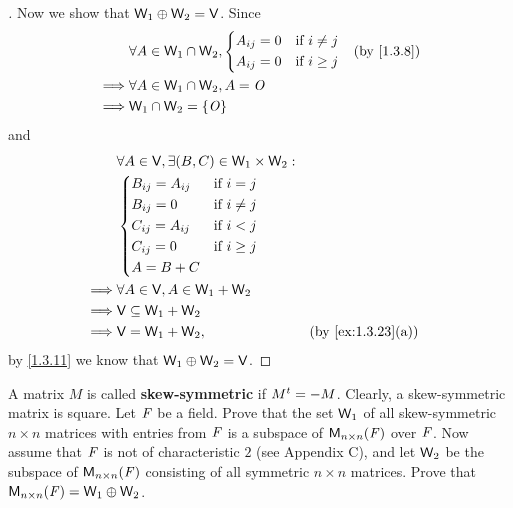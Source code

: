\begin{proof}[]
  Now we show that \(\mathsf{W}_1 \oplus \mathsf{W}_2 = \mathsf{V}\).
  Since
  \begin{align*}
             & \forall A \in \W_1 \cap \W_2, \begin{dcases}
      A_{i j} = 0 & \text{if } i \neq j \\
      A_{i j} = 0 & \text{if } i \geq j
    \end{dcases} &  & \text{(by \cref{1.3.8})} \\
    \implies & \forall A \in \W_1 \cap \W_2, A = \zm                                                  \\
    \implies & \W_1 \cap \W_2 = \set{\zm}
  \end{align*}
  and
  \begin{align*}
             & \forall A \in \V, \exists (B, C) \in \W_1 \times \W_2 :                                      \\
             & \begin{dcases}
      B_{i j} = A_{i j} & \text{if } i = j    \\
      B_{i j} = 0       & \text{if } i \neq j \\
      C_{i j} = A_{i j} & \text{if } i < j    \\
      C_{i j} = 0       & \text{if } i \geq j \\
      A = B + C
    \end{dcases}                                                                   \\
    \implies & \forall A \in \V, A \in \W_1 + \W_2                                                          \\
    \implies & \V \subseteq \W_1 + \W_2                                                                     \\
    \implies & \V = \W_1 + \W_2,                                       &  & \text{(by \cref{ex:1.3.23}(a))}
  \end{align*}
  by \cref{1.3.11} we know that \(\mathsf{W}_1 \oplus \mathsf{W}_2 = \mathsf{V}\).
\end{proof}

\begin{ex}\label{ex:1.3.28}
  A matrix \(M\) is called \textbf{skew-symmetric} if \({M}^{t} = -M\).
  Clearly, a skew-symmetric matrix is square.
  Let \(\mathit{F}\) be a field.
  Prove that the set \(\mathsf{W}_1\) of all skew-symmetric \(n \times n\) matrices with entries from \(\mathit{F}\) is a subspace of \(\mathsf{M}_{{n} \times n}({\mathit{F}})\) over \(\mathit{F}\).
  Now assume that \(\mathit{F}\) is not of characteristic \(2\) (see Appendix C), and let \(\mathsf{W}_2\) be the subspace of \(\mathsf{M}_{{n} \times n}({\mathit{F}})\) consisting of all symmetric \(n \times n\) matrices.
  Prove that \(\mathsf{M}_{{n} \times n}({\mathit{F}}) = \mathsf{W}_1 \oplus \mathsf{W}_2\).
\end{ex}

